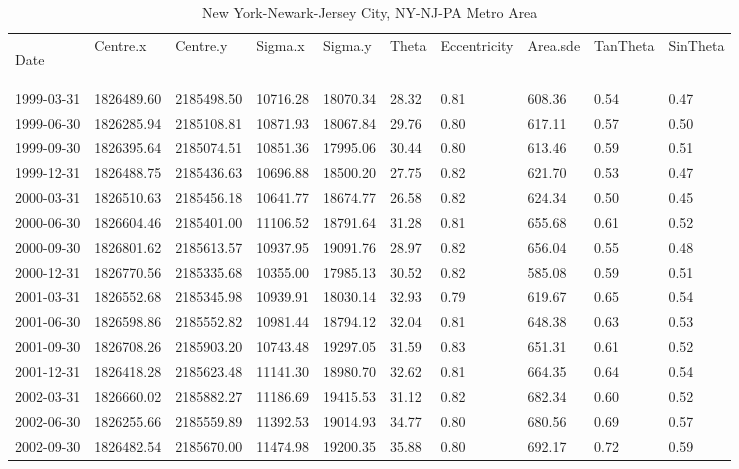 \begin{landscape}
\singlespacing
\small
\centering
\begin{longtable}{llllllllll}

\caption{New York-Newark-Jersey City, NY-NJ-PA Metro Area} 
\endfirsthead
\caption{New York-Newark-Jersey City, NY-NJ-PA Metro Area} 
\endhead
\label{tab:NY_SE} 

Date       & Centre.x   & Centre.y   & Sigma.x  & Sigma.y  & Theta  & Eccentricity & Area.sde & TanTheta & SinTheta \\
1999-03-31 & 1826489.60 & 2185498.50 & 10716.28 & 18070.34 & 28.32 & 0.81 & 608.36 & 0.54 & 0.47 \\
1999-06-30 & 1826285.94 & 2185108.81 & 10871.93 & 18067.84 & 29.76 & 0.80 & 617.11 & 0.57 & 0.50 \\
1999-09-30 & 1826395.64 & 2185074.51 & 10851.36 & 17995.06 & 30.44 & 0.80 & 613.46 & 0.59 & 0.51 \\
1999-12-31 & 1826488.75 & 2185436.63 & 10696.88 & 18500.20 & 27.75 & 0.82 & 621.70 & 0.53 & 0.47 \\
2000-03-31 & 1826510.63 & 2185456.18 & 10641.77 & 18674.77 & 26.58 & 0.82 & 624.34 & 0.50 & 0.45 \\
2000-06-30 & 1826604.46 & 2185401.00 & 11106.52 & 18791.64 & 31.28 & 0.81 & 655.68 & 0.61 & 0.52 \\
2000-09-30 & 1826801.62 & 2185613.57 & 10937.95 & 19091.76 & 28.97 & 0.82 & 656.04 & 0.55 & 0.48 \\
2000-12-31 & 1826770.56 & 2185335.68 & 10355.00 & 17985.13 & 30.52 & 0.82 & 585.08 & 0.59 & 0.51 \\
2001-03-31 & 1826552.68 & 2185345.98 & 10939.91 & 18030.14 & 32.93 & 0.79 & 619.67 & 0.65 & 0.54 \\
2001-06-30 & 1826598.86 & 2185552.82 & 10981.44 & 18794.12 & 32.04 & 0.81 & 648.38 & 0.63 & 0.53 \\
2001-09-30 & 1826708.26 & 2185903.20 & 10743.48 & 19297.05 & 31.59 & 0.83 & 651.31 & 0.61 & 0.52 \\
2001-12-31 & 1826418.28 & 2185623.48 & 11141.30 & 18980.70 & 32.62 & 0.81 & 664.35 & 0.64 & 0.54 \\
2002-03-31 & 1826660.02 & 2185882.27 & 11186.69 & 19415.53 & 31.12 & 0.82 & 682.34 & 0.60 & 0.52 \\
2002-06-30 & 1826255.66 & 2185559.89 & 11392.53 & 19014.93 & 34.77 & 0.80 & 680.56 & 0.69 & 0.57 \\
2002-09-30 & 1826482.54 & 2185670.00 & 11474.98 & 19200.35 & 35.88 & 0.80 & 692.17 & 0.72 & 0.59 \\

\end{longtable}
\end{landscape}
